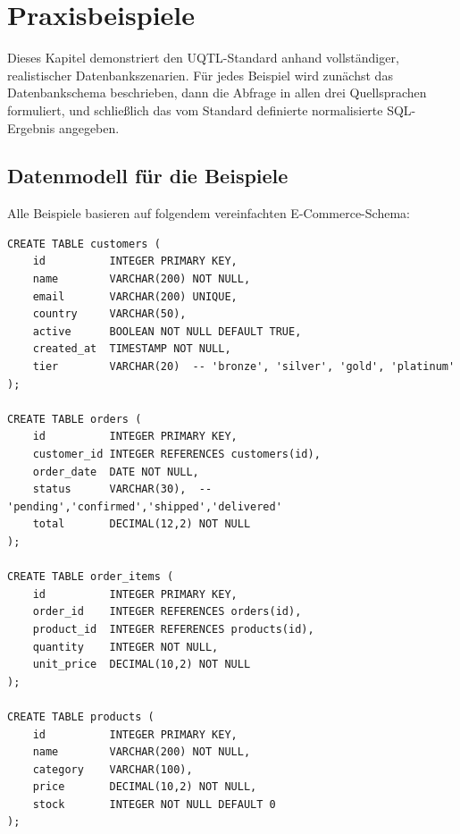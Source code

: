 ﻿%
\section{Praxisbeispiele}
\label{sec:beispiele}

Dieses Kapitel demonstriert den UQTL-Standard anhand vollständiger,
realistischer Datenbankszenarien. Für jedes Beispiel wird zunächst das
Datenbankschema beschrieben, dann die Abfrage in allen drei Quellsprachen
formuliert, und schließlich das vom Standard definierte normalisierte
SQL-Ergebnis angegeben.

\subsection{Datenmodell für die Beispiele}
\label{subsec:datenmodell}

Alle Beispiele basieren auf folgendem vereinfachten E-Commerce-Schema:

\begin{lstlisting}[style=sqlstyle, caption={Datenbankschema für Beispiele},
  label=lst:schema]
CREATE TABLE customers (
    id          INTEGER PRIMARY KEY,
    name        VARCHAR(200) NOT NULL,
    email       VARCHAR(200) UNIQUE,
    country     VARCHAR(50),
    active      BOOLEAN NOT NULL DEFAULT TRUE,
    created_at  TIMESTAMP NOT NULL,
    tier        VARCHAR(20)  -- 'bronze', 'silver', 'gold', 'platinum'
);

CREATE TABLE orders (
    id          INTEGER PRIMARY KEY,
    customer_id INTEGER REFERENCES customers(id),
    order_date  DATE NOT NULL,
    status      VARCHAR(30),  -- 'pending','confirmed','shipped','delivered'
    total       DECIMAL(12,2) NOT NULL
);

CREATE TABLE order_items (
    id          INTEGER PRIMARY KEY,
    order_id    INTEGER REFERENCES orders(id),
    product_id  INTEGER REFERENCES products(id),
    quantity    INTEGER NOT NULL,
    unit_price  DECIMAL(10,2) NOT NULL
);

CREATE TABLE products (
    id          INTEGER PRIMARY KEY,
    name        VARCHAR(200) NOT NULL,
    category    VARCHAR(100),
    price       DECIMAL(10,2) NOT NULL,
    stock       INTEGER NOT NULL DEFAULT 0
);
\end{lstlisting}

